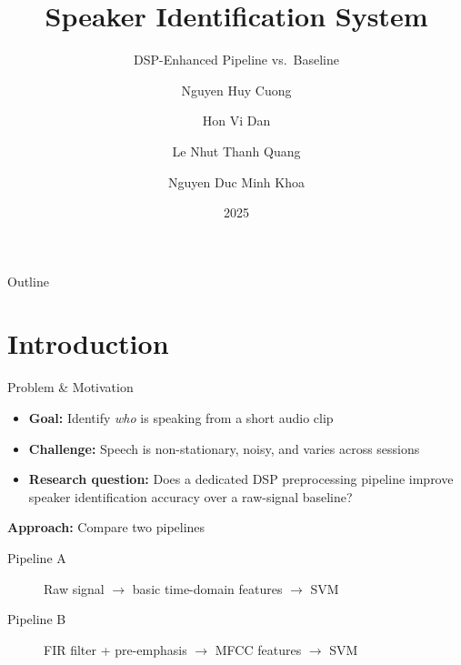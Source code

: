 \documentclass[aspectratio=169]{beamer}
\title{Speaker Identification System}
\subtitle{DSP-Enhanced Pipeline vs.\ Baseline}
\author{Nguyen Huy Cuong \and Hon Vi Dan \and Le Nhut Thanh Quang \and Nguyen Duc Minh Khoa}
\institute{FPT University — DSP501\\Supervisor: Dr.\ Dang Ngoc Minh Duc}
\date{2025}
\begin{document}
\begin{frame}
\titlepage
\end{frame}

\begin{frame}{Outline}
\tableofcontents
\end{frame}

\section{Introduction}
\begin{frame}{Problem \& Motivation}
\begin{itemize}
    \item \textbf{Goal:} Identify \emph{who} is speaking from a short audio clip
    \item \textbf{Challenge:} Speech is non-stationary, noisy, and varies across sessions
    \item \textbf{Research question:} Does a dedicated DSP preprocessing pipeline improve speaker identification accuracy over a raw-signal baseline?
\end{itemize}

\vspace{0.5cm}
\textbf{Approach:} Compare two pipelines
\begin{description}
    \item[Pipeline A] Raw signal $\rightarrow$ basic time-domain features $\rightarrow$ SVM
    \item[Pipeline B] FIR filter + pre-emphasis $\rightarrow$ MFCC features $\rightarrow$ SVM
\end{description}
\end{frame}

\end{document}
